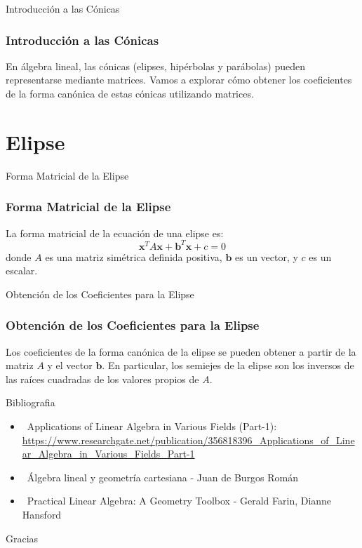 \documentclass[xcolor={dvipsnames},aspectratio=169,10pt]{beamer}
\begin{document}
\begin{frame}{Introducción a las Cónicas}
  \frametitle{Introducción a las Cónicas}
  En álgebra lineal, las cónicas (elipses, hipérbolas y parábolas) pueden representarse mediante matrices. Vamos a explorar cómo obtener los coeficientes de la forma canónica de estas cónicas utilizando matrices.
\end{frame}

\section{Elipse}

\begin{frame}{Forma Matricial de la Elipse}
  \frametitle{Forma Matricial de la Elipse}
  La forma matricial de la ecuación de una elipse es:
  \begin{equation*}
    \mathbf{x}^T A \mathbf{x} + \mathbf{b}^T \mathbf{x} + c = 0
  \end{equation*}
  donde $A$ es una matriz simétrica definida positiva, $\mathbf{b}$ es un vector, y $c$ es un escalar.
\end{frame}

\begin{frame}{Obtención de los Coeficientes para la Elipse}
  \frametitle{Obtención de los Coeficientes para la Elipse}
  Los coeficientes de la forma canónica de la elipse se pueden obtener a partir de la matriz $A$ y el vector $\mathbf{b}$. En particular, los semiejes de la elipse son los inversos de las raíces cuadradas de los valores propios de $A$.
\end{frame}

\begin{frame}{Bibliografia}
  \begin{itemize}
    \item \faGlobe\, Applications of Linear Algebra in Various Fields (Part-1): \url{https://www.researchgate.net/publication/356818396_Applications_of_Linear_Algebra_in_Various_Fields_Part-1}
    \item \faBook\, Álgebra lineal y geometría cartesiana - Juan de Burgos Román
    \item \faBook\, Practical Linear Algebra: A Geometry Toolbox - Gerald Farin, Dianne Hansford
  \end{itemize}
\end{frame}

\begin{frame}[standout]
  Gracias \\
\end{frame}
\end{document}
